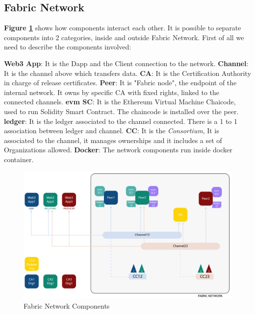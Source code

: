 \subsection{Fabric Network}

\textbf{Figure \ref{fig:network}} shows how components interact each other. It is possible to separate components 
into 2 categories, inside and outside Fabric Network. First of all we need to describe the components involved:

\begin{outline}
    \1 \textbf{Web3 App}: It is the Dapp and the Client connection to the network.
    \1 \textbf{Channel}: It is the channel above which transfers data. 
    \1 \textbf{CA}: It is the Certification Authority in charge of release certificates.
    \1 \textbf{Peer}: It is "Fabric node", the endpoint of the internal network. It owns by specific CA with 
    fixed rights, linked to the connected channels. 
    \1 \textbf{evm SC}: It is the Ethereum Virtual Machine Chaicode, used to run Solidity Smart Contract. The chaincode 
    is installed over the peer.
    \1 \textbf{ledger}: It is the ledger associated to the channel connected. There is a 1 to 1 association 
    between ledger and channel.
    \1 \textbf{CC}: It is the \textit{Consortium}, It is associated to the channel, it manages ownerships and 
    it includes a set of Organizations allowed. 
    \1 \textbf{Docker}: The network components run inside docker container. 
\end{outline}

\begin{figure}[h!]
	\centering
	\includegraphics[totalheight=10cm]{img/network.png}
	\caption{Fabric Network Components}
	\label{fig:network}
\end{figure}

